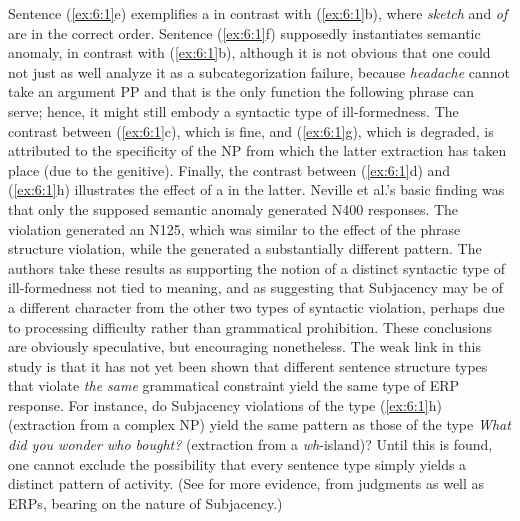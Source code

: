  \noindent
 Sentence (\ref{ex:6:1}e) exemplifies a  in contrast with (\ref{ex:6:1}b), where
 \textit{sketch} and \textit{of} are in the correct order. Sentence (\ref{ex:6:1}f)
 supposedly
 instantiates semantic anomaly, in contrast with (\ref{ex:6:1}b), although it is not obvious that one could not just as well analyze it as a subcategorization failure, because \textit{headache} cannot take an argument PP and that is the only function the following phrase can serve; hence, it might still embody a syntactic type of ill-formedness. The contrast between  (\ref{ex:6:1}c), which  is fine,  and  (\ref{ex:6:1}g), which  is degraded,  is attributed  to  the specificity of the NP from which the latter extraction has taken place (due to the genitive). Finally, the contrast between (\ref{ex:6:1}d) and (\ref{ex:6:1}h) illustrates the effect of a  in the latter. Neville et al.'s basic finding was that only the supposed semantic anomaly generated N400 responses. The  violation generated an N125, which was similar to the effect of the phrase structure violation, while the  generated a substantially different pattern. The authors take these results
 as supporting the notion of a distinct syntactic type of ill-formedness not tied to meaning, and as suggesting that Subjacency may be of a different character from the other two types of syntactic violation, perhaps due to processing difficulty rather than grammatical prohibition. These conclusions are obviously speculative, but encouraging nonetheless. The weak link in this study is that it has not yet been shown that different sentence structure types that violate \textit{the same} grammatical constraint yield the same type of ERP response. For instance, do Subjacency violations of the type (\ref{ex:6:1}h) (extraction from a complex NP) yield the same pattern as those of the type \textit{What did you wonder who bought?} (extraction from a \textit{wh}-island)? Until this is found, one cannot exclude the possibility that every sentence type simply yields a distinct pattern of activity. (See \citet{KluenderEtAl1993} for more evidence, from judgments as well as ERPs, bearing on the nature of Subjacency.)

